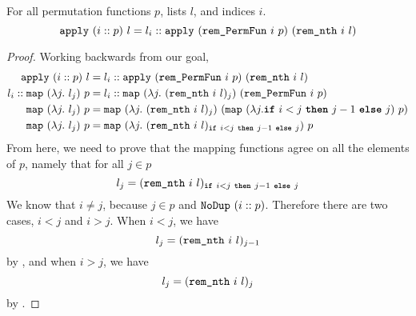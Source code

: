 \documentclass[sigplan,10pt,anonymous,review]{thesis}
\begin{document}
\begin{theorem}
  For all permutation functions $p$, lists $l$, and indices $i$.
  \begin{equation*}
    \texttt{\textup{apply}}~(i::p)~l =
    l_i :: \texttt{\textup{apply}}~(\texttt{\textup{rem\_PermFun}}~i~p)~(\texttt{\textup{rem\_nth}}~i~l)
  \end{equation*}
\end{theorem}
\begin{proof}
  Working backwards from our goal,
  \begin{align*}
    \texttt{\textup{apply}}~(i::p)~l &=
    l_i :: \texttt{\textup{apply}}~(\texttt{\textup{rem\_PermFun}}~i~p)~(\texttt{\textup{rem\_nth}}~i~l) \\
    l_i :: \texttt{\textup{map}}~(\lambda j.~l_j)~p &=
    l_i :: \texttt{\textup{map}}~(\lambda j.~(\texttt{\textup{rem\_nth}}~i~l)_j)~(\texttt{\textup{rem\_PermFun}}~i~p) \\
    \texttt{\textup{map}}~(\lambda j.~l_j)~p &=
    \texttt{\textup{map}}~(\lambda j.~(\texttt{\textup{rem\_nth}}~i~l)_j)~(\texttt{\textup{map}}~(\lambda j. \texttt{\textbf{if}}~i < j~\texttt{\textbf{then}}~j-1~\texttt{\textbf{else}}~j)~p) \\
    \texttt{\textup{map}}~(\lambda j.~l_j)~p &=
    \texttt{\textup{map}}~(\lambda j.~(\texttt{\textup{rem\_nth}}~i~l)_{\texttt{\textbf{if}}~i < j~\texttt{\textbf{then}}~j-1~\texttt{\textbf{else}}~j})~p \\
  \end{align*}
  From here, we need to prove that the mapping functions agree on all
  the elements of $p$, namely that for all $j \in p$
  \begin{equation*}
    l_j = (\texttt{\textup{rem\_nth}}~i~l)_{\texttt{\textbf{if}}~i < j~\texttt{\textbf{then}}~j-1~\texttt{\textbf{else}}~j}
  \end{equation*}
  We know that $i \neq j$, because $j \in p$ and $\texttt{\textup{NoDup}}~(i :: p)$.
  Therefore there are two cases, $i < j$ and $i > j$. When $i < j$, we have
  \begin{equation*}
    l_j = (\texttt{\textup{rem\_nth}}~i~l)_{j-1}
  \end{equation*}
  by , and when $i > j$, we have
  \begin{equation*}
    l_j = (\texttt{\textup{rem\_nth}}~i~l)_j
  \end{equation*}
  by .
\end{proof}
\end{document}
